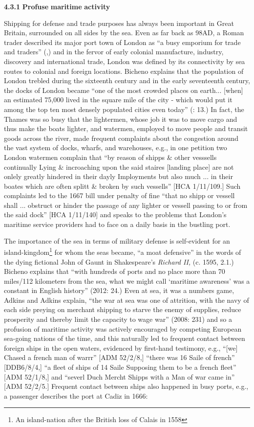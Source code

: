 \textbf{4.3.1} \textbf{Profuse} \textbf{maritime} \textbf{activity}

Shipping for defense and trade purposes has always been important in Great Britain, surrounded on all sides by the sea. Even as far back as 98AD, a Roman trader described its major port town of London as “a busy emporium for trade and traders” (\citealt{Tacitus1913},) and in the fervor of early colonial manufacture, industry, discovery and international trade, London was defined by its connectivity by sea routes to colonial and foreign locations. Bicheno explains that the population of London trebled during the sixteenth century and in the early seventeenth century, the docks of London became “one of the most crowded places on earth... [when] an estimated 75,000 lived in the square mile of the city - which would put it among the top ten most densely populated cities even today” (\citealt{Bicheno2012}: 13.) In fact, the Thames was so busy that the lightermen, whose job it was to move cargo and thus make the boats lighter, and watermen, employed to move people and transit goods across the river, made frequent complaints about the congestion around the vast system of docks, wharfs, and warehouses, e.g., in one petition two London watermen complain that “by reason of shipps \& other vesssells continually Lying \& incroaching upon the said staires [landing place] are not onlely greatly hindered in their dayly Imployments but also much ... in their boates which are often splitt \& broken by such vessells” [HCA 1/11/109.]  Such complaints led to the 1667 bill under penalty of fine “that no shipp or vessell shall ... obstruct or hinder the passage of any lighter or vessell passing to or from the said dock” [HCA 1/11/140] and speaks to the problems that London’s maritime service providers had to face on a daily basis in the bustling port. 

The importance of the sea in terms of military defense is self-evident for an island-kingdom\footnote{An island-nation after the British loss of Calais in 1558} for whom the seas became, “a moat defensive” in the words of the dying fictional John of Gaunt in Shakespeare’s \textit{Richard II,} (c. 1595, 2.1.) Bicheno explains that “with hundreds of ports and no place more than 70 miles/112 kilometers from the sea, what we might call ‘maritime awareness’ was a constant in English history” (2012: 24.) Even at sea, it was a numbers game, Adkins and Adkins explain, “the war at sea was one of attrition, with the navy of each side preying on merchant shipping to starve the enemy of supplies, reduce prosperity and thereby limit the capacity to wage war” (2008: 231) and so a profusion of maritime activity was actively encouraged by competing European sea-going nations of the time, and this naturally led to frequent contact between foreign ships in the open waters, evidenced by first-hand testimony, e.g., “[we] Chased a french man of warrr” [ADM 52/2/8,] “there was 16 Saile of french” [DDB6/8/4,] “a fleet of ships of 14 Saile Supposing them to be a french fleet” [ADM 52/1/8,] and “severl Duch Mercht Shipps with a Man of war came in” [ADM 52/2/5.] Frequent contact between ships also happened in busy ports, e.g., a passenger describes the port at Cadiz in 1666:

